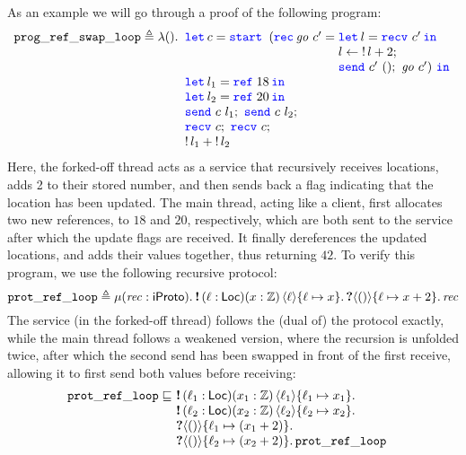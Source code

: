 As an example we will go through a proof of the following program:
\[
\begin{array}[t]{@{} l @{\ } l @{}}
\mathtt{prog\_ref\_swap\_loop} \eqdef{}
\Lam \TT. &
\LetNoIn {\chan} = \start
  (\Rec {\mathit{go}} \chan' =
    \begin{array}[t]{@{} l @{}}
      \Let l = {\recv \chan'} in \\
        l \leftarrow \deref l + 2; \\
      \send {\chan'} \TT;\ \mathit{go}\ \chan')\ \In \\
    \end{array}\\
& \Let {l_1} = \newref 18 in\\
& \Let {l_2} = \newref 20 in\\
& \send \chan l_1;\ \send \chan l_2; \\
& \recv \chan;\ \recv \chan;\\
& \deref l_1 + \deref l_2
\end{array}
\]
Here, the forked-off thread acts as a service that recursively receives locations,
adds 2 to their stored number, and then sends back a flag indicating that the
location has been updated.
The main thread, acting like a client, first allocates two new references,
to $18$ and $20$, respectively, which are both sent to the service
after which the update flags are received.
It finally dereferences the updated locations, and adds their values together,
thus returning $42$.
To verify this program, we use the following recursive protocol:
\[
  \mathtt{prot\_ref\_loop} \eqdef \MU (\recvar:\iProto).
  \sendprot{(\loc : \Loc) (\var : \integer)}{\loc}{\loc \mapsto \var}
  \recvprot{}{\TT}{\loc \mapsto \var+2}
  \recvar
\]
The service (in the forked-off thread) follows the (dual of) the protocol exactly,
while the main thread follows a weakened version, where the recursion is unfolded
twice, after which the second send has been swapped in front of the first receive,
allowing it to first send both values before receiving:
\[
  \begin{array}{@{} l @{\ } l}
  \mathtt{prot\_ref\_loop}
  \subprotop
  &\begin{array}[t]{@{} l}
  \sendprot{(\loc_1:\Loc)(\var_1:\integer)}{\loc_1}{\loc_1 \mapsto \var_1} \\
  \sendprot{(\loc_2:\Loc)(\var_2:\integer)}{\loc_2}{\loc_2 \mapsto \var_2} \\
  \recvprot{}{\TT}{\loc_1 \mapsto (\var_1+2)} \\
  \recvprot{}{\TT}{\loc_2 \mapsto (\var_2+2)}
  \mathtt{prot\_ref\_loop}
  \end{array}
  \end{array}
\]
